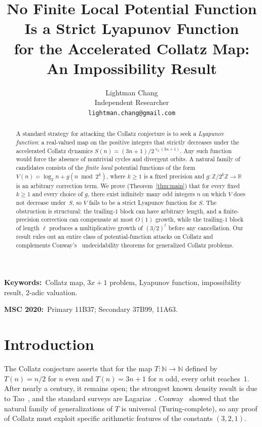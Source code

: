 \documentclass[11pt,a4paper]{article}
\title{\Large No Finite Local Potential Function Is a Strict Lyapunov Function\\
for the Accelerated Collatz Map:\\[4pt]
\large An Impossibility Result}
\author{Lightman Chang\\
Independent Researcher\\
\texttt{lightman.chang@gmail.com}}
\date{}
\theoremstyle{definition}
\theoremstyle{remark}
\DeclareMathOperator{\val}{v}
\newcommand{\N}{\mathbb{N}}
\newcommand{\Z}{\mathbb{Z}}
\newcommand{\R}{\mathbb{R}}
\begin{document}
\maketitle

\begin{abstract}
A standard strategy for attacking the Collatz conjecture is to seek a
\emph{Lyapunov function}: a real-valued map on the positive integers
that strictly decreases under the accelerated Collatz dynamics
$S(n) = (3n+1)/2^{\val_2(3n+1)}$.  Any such function would force the
absence of nontrivial cycles and divergent orbits.  A natural family of
candidates consists of the \emph{finite local} potential functions of
the form $V(n) = \log_2 n + g(n \bmod 2^k)$, where $k \geq 1$ is a
fixed precision and $g \colon \Z / 2^k \Z \to \R$ is an arbitrary
correction term.  We prove (Theorem~\ref{thm:main}) that for every
fixed $k \geq 1$ and every choice of $g$, there exist infinitely many
odd integers $n$ on which $V$ does not decrease under~$S$, so $V$ fails
to be a strict Lyapunov function for $S$.  The obstruction is structural:
the trailing-$1$ block can have arbitrary length, and a finite-precision
correction can compensate at most $O(1)$ growth, while the trailing-$1$
block of length $\ell$ produces a multiplicative growth of
$(3/2)^\ell$ before any cancellation.  Our result rules out an entire
class of potential-function attacks on Collatz and complements
Conway's~\cite{Conway1972} undecidability theorems for generalized
Collatz problems.
\end{abstract}

\noindent\textbf{Keywords:}~Collatz map, $3x{+}1$ problem, Lyapunov
function, impossibility result, $2$-adic valuation.

\smallskip
\noindent\textbf{MSC 2020:}~Primary 11B37; Secondary 37B99, 11A63.

\section{Introduction}\label{sec:intro}

The Collatz conjecture asserts that for the map
$T \colon \N \to \N$ defined by $T(n) = n/2$ for $n$ even and
$T(n) = 3n + 1$ for $n$ odd, every orbit reaches~$1$.  After nearly a
century, it remains open; the strongest known density result is due to
Tao~\cite{Tao2022}, and the standard surveys are
Lagarias~\cite{Lagarias1985,Lagarias2010}.  Conway~\cite{Conway1972}
showed that the natural family of generalizations of $T$ is
universal (Turing-complete), so any proof of Collatz must exploit
specific arithmetic features of the constants $(3, 2, 1)$.
\end{document}
